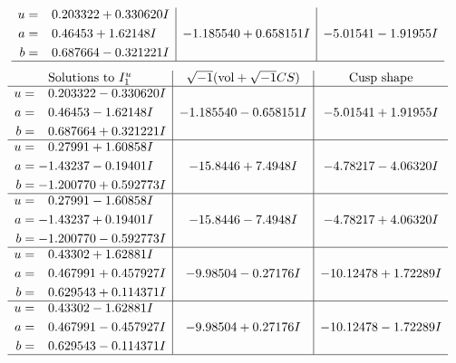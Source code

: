 \documentclass[1p]{elsarticle_modified}
\theoremstyle{definition}
\newcommand{\I}{\sqrt{-1}}
\begin{document}
$$\begin{array}{c|c|c}
\begin{aligned}
u &= \phantom{-}0.203322 + 0.330620 I \\
a &= \phantom{-}0.46453 + 1.62148 I \\
b &= \phantom{-}0.687664 - 0.321221 I\end{aligned}
 & -1.185540 + 0.658151 I & -5.01541 - 1.91955 I\\
 \hline 
 \end{array}$$\newpage$$\begin{array}{c|c|c}  
\text{Solutions to }I^u_{1}& \I (\text{vol} + \sqrt{-1}CS) & \text{Cusp shape}\\
 \hline 
\begin{aligned}
u &= \phantom{-}0.203322 - 0.330620 I \\
a &= \phantom{-}0.46453 - 1.62148 I \\
b &= \phantom{-}0.687664 + 0.321221 I\end{aligned}
 & -1.185540 - 0.658151 I & -5.01541 + 1.91955 I \\ \hline\begin{aligned}
u &= \phantom{-}0.27991 + 1.60858 I \\
a &= -1.43237 - 0.19401 I \\
b &= -1.200770 + 0.592773 I\end{aligned}
 & -15.8446 + 7.4948 I & -4.78217 - 4.06320 I \\ \hline\begin{aligned}
u &= \phantom{-}0.27991 - 1.60858 I \\
a &= -1.43237 + 0.19401 I \\
b &= -1.200770 - 0.592773 I\end{aligned}
 & -15.8446 - 7.4948 I & -4.78217 + 4.06320 I \\ \hline\begin{aligned}
u &= \phantom{-}0.43302 + 1.62881 I \\
a &= \phantom{-}0.467991 + 0.457927 I \\
b &= \phantom{-}0.629543 + 0.114371 I\end{aligned}
 & -9.98504 - 0.27176 I & -10.12478 + 1.72289 I \\ \hline\begin{aligned}
u &= \phantom{-}0.43302 - 1.62881 I \\
a &= \phantom{-}0.467991 - 0.457927 I \\
b &= \phantom{-}0.629543 - 0.114371 I\end{aligned}
 & -9.98504 + 0.27176 I & -10.12478 - 1.72289 I\\
 \hline 
 \end{array}$$\newpage\newpage\renewcommand{\arraystretch}{1}
\end{document}
